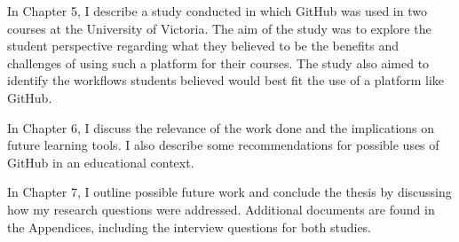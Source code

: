 In Chapter 5, I describe a study conducted in which GitHub was used in two courses at the University of Victoria. The aim of the study was to explore the student perspective regarding what they believed to be the benefits and challenges of using such a platform for their courses. The study also aimed to identify the workflows students believed would best fit the use of a platform like GitHub.

In Chapter 6, I discuss the relevance of the work done and the implications on future learning tools. I also describe some recommendations for possible uses of GitHub in an educational context.

In Chapter 7, I outline possible future work and conclude the thesis by discussing how my research questions were addressed. Additional documents are found in the Appendices, including the interview questions for both studies.



